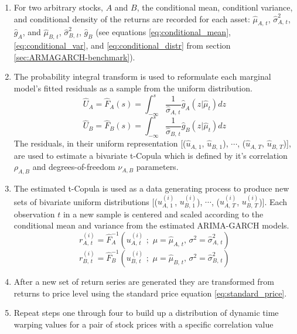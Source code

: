 \documentclass[12pt]{article}
\begin{document}
\begin{enumerate}
    \item For two arbitrary stocks, $A$ and $B$, the conditional mean, conditionl variance, and conditional density of the returns are recorded for each asset: $\hat{\mu}_{A,\,t}$, $\hat{\sigma}^{2}_{A,\,t}$, $\hat{g}_{A}$, and $\hat{\mu}_{B,\,t}$, $\hat{\sigma}^{2}_{B,\,t}$, $\hat{g}_{B}$ (see equations \ref{eq:conditional_mean}, \ref{eq:conditional_var}, and \ref{eq:conditional_distr} from section \ref{sec:ARMAGARCH-benchmark}).
    \item The probability integral transform is used to reformulate each marginal model's fitted residuals as a sample from the uniform distribution.
    \begin{equation} \nonumber
        \hat{U}_{A} = \hat{F}_{A}(s) = \int_{-\infty}^{s} \frac{1}{\hat{\sigma}_{A,\,t}} \hat{g}_{A} \left(z | \hat{\mu}_{t}\right) dz
    \end{equation}
    \begin{equation} \nonumber
        \hat{U}_{B} = \hat{F}_{B}(s) = \int_{-\infty}^{s} \frac{1}{\hat{\sigma}_{B,\,t}} \hat{g}_{B} \left(z | \hat{\mu}_{t}\right) dz
    \end{equation}
    The residuals, in their uniform representation [($\hat{u}_{A,\,1}$, $\hat{u}_{B,\,1}$), $\cdots$, ($\hat{u}_{A,\,T}$, $\hat{u}_{B,\,T}$)], are used to estimate a bivariate t-Copula which is defined by it's correlation $\rho_{A,B}$ and degrees-of-freedom $\nu_{A,B}$ parameters.
    \item The estimated t-Copula is used as a data generating process to produce new sets of bivariate uniform distributions [($u^{(i)}_{A,\,1}$, $u^{(i)}_{B,\,1}$), $\cdots$, ($u^{(i)}_{A,\,T}$, $u^{(i)}_{B,\,T}$)]. Each observation $t$ in a new sample is centered and scaled according to the conditional mean and variance from the estimated ARIMA-GARCH models.
    \begin{equation} \nonumber
        r^{(i)}_{A,\,t} = \hat{F}^{-1}_{A} \left(u^{(i)}_{A,\,t}\,\,;\,\, \mu=\hat{\mu}_{A,\,t},\, \sigma^{2}=\hat{\sigma}^{2}_{A,\,t} \right)
    \end{equation}
    \begin{equation} \nonumber
        r^{(i)}_{B,\,t} = \hat{F}^{-1}_{B} \left(u^{(i)}_{B,\,t}\,\,;\,\, \mu=\hat{\mu}_{B,\,t},\, \sigma^{2}=\hat{\sigma}^{2}_{B,\,t} \right)
    \end{equation}
    \item After a new set of return series are generated they are transformed from returns to price level using the standard price equation \ref{eq:standard_price}.
    \item Repeat steps one through four to build up a distribution of dynamic time warping values for a pair of stock prices with a specific correlation value
\end{enumerate}
\end{document}
